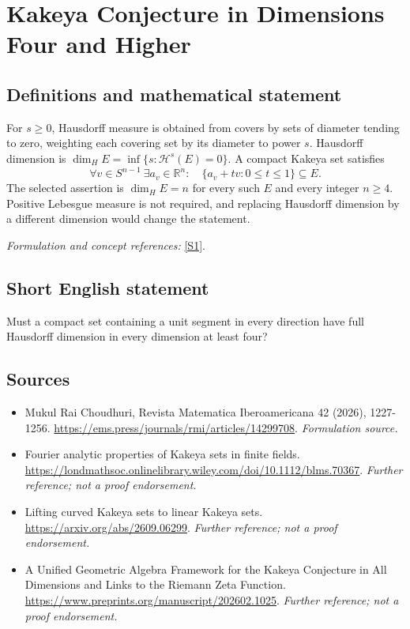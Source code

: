 \documentclass[11pt]{article}
\begin{document}
\section*{\texorpdfstring{Kakeya Conjecture in Dimensions Four and Higher}{Kakeya Conjecture in Dimensions Four and Higher}}\label{30006573}
\subsection{Definitions and mathematical statement}
For $s\ge0$, Hausdorff measure is obtained from covers by sets of diameter tending to zero, weighting each covering set by its diameter to power $s$. Hausdorff dimension is $\dim_H E=\inf\{s:\mathcal H^s(E)=0\}$. A compact Kakeya set satisfies
\[
 \forall v\in S^{n-1}\ \exists a_v\in{\mathbb{R}}^n:\quad
 \{a_v+tv:0\le t\le1\}\subseteq E.
\]
The selected assertion is $\dim_H E=n$ for every such $E$ and every integer $n\ge4$. Positive Lebesgue measure is not required, and replacing Hausdorff dimension by a different dimension would change the statement.
\par\smallskip\textit{Formulation and concept references:} \href{https://ems.press/journals/rmi/articles/14299708}{[S1]}.

\subsection{Short English statement}
Must a compact set containing a unit segment in every direction have full Hausdorff dimension in every dimension at least four?
\subsection{Sources}
\begin{itemize}
\item[S1]Mukul Rai Choudhuri, Revista Matematica Iberoamericana 42 (2026), 1227-1256.
\url{https://ems.press/journals/rmi/articles/14299708}.
\textit{Formulation source.}
\item[S2]Fourier analytic properties of Kakeya sets in finite fields.
\url{https://londmathsoc.onlinelibrary.wiley.com/doi/10.1112/blms.70367}.
\textit{Further reference; not a proof endorsement.}
\item[S3]Lifting curved Kakeya sets to linear Kakeya sets.
\url{https://arxiv.org/abs/2609.06299}.
\textit{Further reference; not a proof endorsement.}
\item[S4]A Unified Geometric Algebra Framework for the Kakeya Conjecture in All Dimensions and Links to the Riemann Zeta Function.
\url{https://www.preprints.org/manuscript/202602.1025}.
\textit{Further reference; not a proof endorsement.}
\end{itemize}
\end{document}
